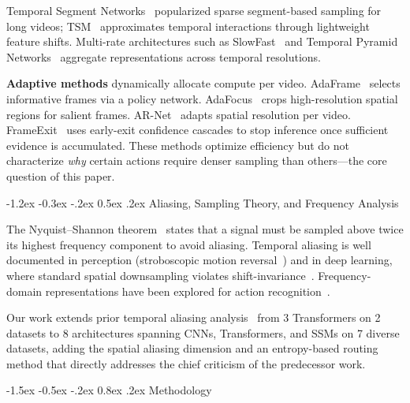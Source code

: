 \documentclass[runningheads]{llncs}
\makeatletter
\renewcommand\section{\@startsection{section}{1}{\z@}%
                       {-1.5ex \@plus -0.5ex \@minus -.2ex}%
                       {0.8ex \@plus .2ex}%
                       {\normalfont\large\bfseries\boldmath}}
\renewcommand\subsection{\@startsection{subsection}{2}{\z@}%
                       {-1.2ex \@plus -0.3ex \@minus -.2ex}%
                       {0.5ex \@plus .2ex}%
                       {\normalfont\normalsize\bfseries\boldmath}}
\makeatother
\begin{document}
Temporal Segment Networks~\cite{wang2016tsn} popularized sparse segment-based
sampling for long videos; TSM~\cite{lin2019tsm} approximates temporal interactions
through lightweight feature shifts.
Multi-rate architectures such as SlowFast~\cite{feichtenhofer2019slowfast} and
Temporal Pyramid Networks~\cite{yang2020tpn} aggregate representations across
temporal resolutions.

\textbf{Adaptive methods} dynamically allocate compute per video.
AdaFrame~\cite{wu2019adaframe} selects informative frames via a policy network.
AdaFocus~\cite{wang2021adafocus} crops high-resolution spatial regions for salient
frames. AR-Net~\cite{meng2020arnet} adapts spatial resolution per video.
FrameExit~\cite{ghodrati2021frameexit} uses early-exit confidence cascades to
stop inference once sufficient evidence is accumulated.
These methods optimize efficiency but do not characterize \emph{why} certain actions
require denser sampling than others—the core question of this paper.

\subsection{Aliasing, Sampling Theory, and Frequency Analysis}

The Nyquist--Shannon theorem~\cite{shannon1949communication} states that a signal
must be sampled above twice its highest frequency component to avoid aliasing.
Temporal aliasing is well documented in perception (stroboscopic motion
reversal~\cite{vanrullen2007wagon}) and in deep learning, where standard
spatial downsampling violates shift-invariance~\cite{zhang2019antialiased}.
Frequency-domain representations have been explored for action
recognition~\cite{tran2014frequency}.

Our work extends prior temporal aliasing analysis~\cite{anon2612} from 3 Transformers
on 2 datasets to 8 architectures spanning CNNs, Transformers, and SSMs on 7 diverse
datasets, adding the spatial aliasing dimension and an entropy-based routing method
that directly addresses the chief criticism of the predecessor work.

\section{Methodology}
\label{sec:method}
\end{document}
